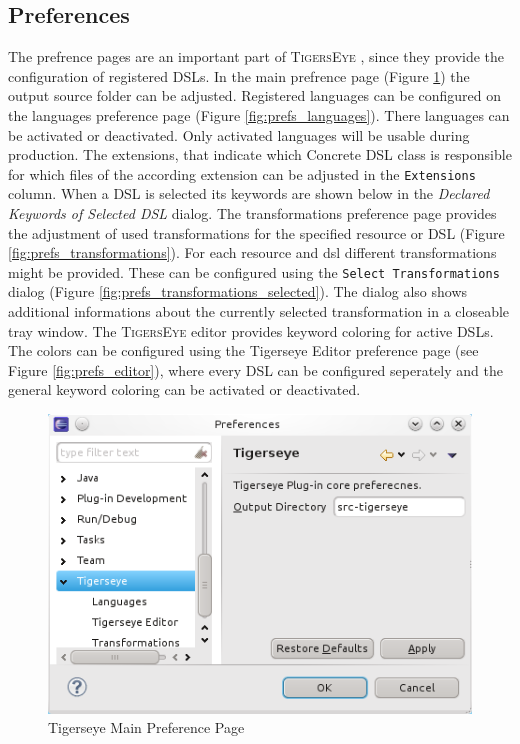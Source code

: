 \documentclass[article,colorback,accentcolor=tud4c]{tudreport}
\newcommand\tiger{%
  \textsc{TigersEye}
}
\begin{document}
	\subsection{Preferences}
	The prefrence pages are an important part of \tiger, since they provide the configuration of registered DSLs. In the main prefrence page (Figure \ref{fig:prefs_main}) the output source folder can be adjusted. Registered languages can be configured on the languages preference page (Figure \ref{fig:prefs_languages}). There languages can be activated or deactivated. Only activated languages will be usable during production. The extensions, that indicate which Concrete DSL class is responsible for which files of the according extension can be adjusted in the \texttt{Extensions} column. When a DSL is selected its keywords are shown below in the \textit{Declared Keywords of Selected DSL} dialog. The transformations preference page provides the adjustment of used transformations for the specified resource or DSL (Figure \ref{fig:prefs_transformations}). For each resource and dsl different transformations might be provided. These can be configured using the \texttt{Select Transformations} dialog (Figure \ref{fig:prefs_transformations_selected}). The dialog also shows additional informations about the currently selected transformation in a closeable tray window. The \tiger editor provides keyword coloring for active DSLs. The colors can be configured using the Tigerseye Editor preference page (see Figure \ref{fig:prefs_editor}), where every DSL can be configured seperately and the general keyword coloring can be activated or deactivated.
	
	\begin{figure}
	  \centering
	  \includegraphics[scale=.5,keepaspectratio=true]{./pics/preferences_main.png}
	  \caption{Tigerseye Main Preference Page}
	  \label{fig:prefs_main}
	\end{figure}
\end{document}
